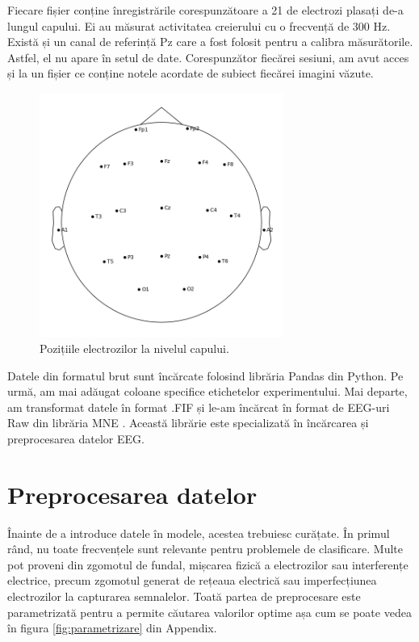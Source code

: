 Fiecare fișier conține înregistrările corespunzătoare a 21 de electrozi plasați de-a lungul capului. 
Ei au măsurat activitatea creierului cu o frecvență de 300 Hz. 
Există și un canal de referință Pz care a fost folosit pentru a calibra măsurătorile. 
Astfel, el nu apare în setul de date. 
Corespunzător fiecărei sesiuni, am avut acces și la un fișier ce conține notele acordate de subiect fiecărei imagini văzute. 

\begin{figure}[H]
    \centering
		\vspace{-1em}
    \includegraphics[width=8cm]{images/Sensor_positions_(eeg).png}
    \caption{Pozițiile electrozilor la nivelul capului.}
		\vspace{-1em}
    \label{fig:sensor_positions}
\end{figure}
Datele din formatul brut sunt încărcate folosind librăria Pandas \cite{reback2020pandas} din Python. Pe urmă, am mai adăugat coloane specifice etichetelor experimentului. Mai departe, am transformat datele în format .FIF și le-am încărcat în format de EEG-uri Raw din librăria MNE \cite{MNE}. Această librărie este specializată în încărcarea și preprocesarea datelor EEG.

\section{Preprocesarea datelor}
Înainte de a introduce datele în modele, acestea trebuiesc curățate. În primul rând, nu toate frecvențele sunt relevante pentru problemele de clasificare. Multe pot proveni din zgomotul de fundal, mișcarea fizică a electrozilor sau interferențe electrice, precum zgomotul generat de rețeaua electrică sau imperfecțiunea electrozilor la capturarea semnalelor. Toată partea de preprocesare este parametrizată pentru a permite căutarea valorilor optime așa cum se poate vedea în figura \ref{fig:parametrizare} din Appendix.

